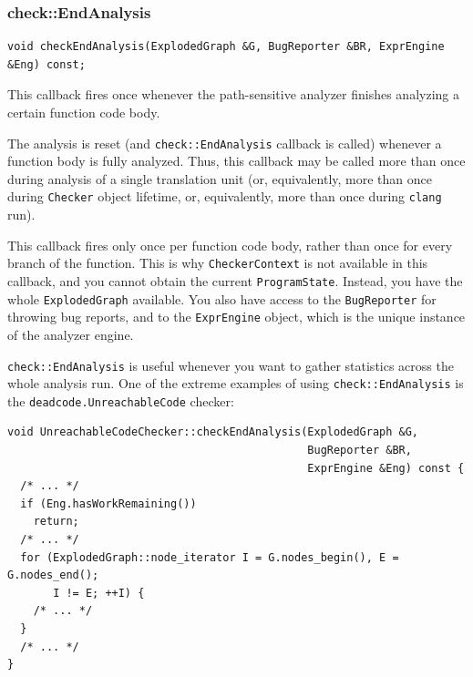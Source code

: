 \documentclass[a4paper,12pt]{article}
\newenvironment{nobr}{\begin{minipage}{\textwidth}\setlength\parskip{1em}
}{\end{minipage}\ignorespacesafterend}
\begin{document}
\begin{nobr}
\subsubsection{check::EndAnalysis}

\begin{lstlisting}[style=cplusplus,numbers=none]
void checkEndAnalysis(ExplodedGraph &G, BugReporter &BR, ExprEngine &Eng) const;
\end{lstlisting}

This callback fires once whenever the path-sensitive analyzer finishes analyzing a certain function code body.
\end{nobr}

The analysis is reset (and \lstinline|check::EndAnalysis| callback is called) whenever a function body is fully analyzed. Thus, this callback may be called more than once during analysis of a single translation unit (or, equivalently, more than once during \lstinline|Checker| object lifetime, or, equivalently, more than once during \lstinline|clang| run).

This callback fires only once per function code body, rather than once for every branch of the function. This is why \lstinline|CheckerContext| is not available in this callback, and you cannot obtain the current \lstinline|ProgramState|. Instead, you have the whole \lstinline|ExplodedGraph| available. You also have access to the \lstinline|BugReporter| for throwing bug reports, and to the \lstinline|ExprEngine| object, which is the unique instance of the analyzer engine.

\begin{nobr}
\lstinline|check::EndAnalysis| is useful whenever you want to gather statistics across the whole analysis run. One of the extreme examples of using \lstinline|check::EndAnalysis| is the \lstinline|deadcode.UnreachableCode| checker:

\begin{lstlisting}[style=cplusplus]
void UnreachableCodeChecker::checkEndAnalysis(ExplodedGraph &G,
                                              BugReporter &BR,
                                              ExprEngine &Eng) const {
  /* ... */
  if (Eng.hasWorkRemaining())
    return;
  /* ... */
  for (ExplodedGraph::node_iterator I = G.nodes_begin(), E = G.nodes_end();
       I != E; ++I) {
    /* ... */
  }
  /* ... */
}
\end{lstlisting}
\end{nobr}
\end{document}
